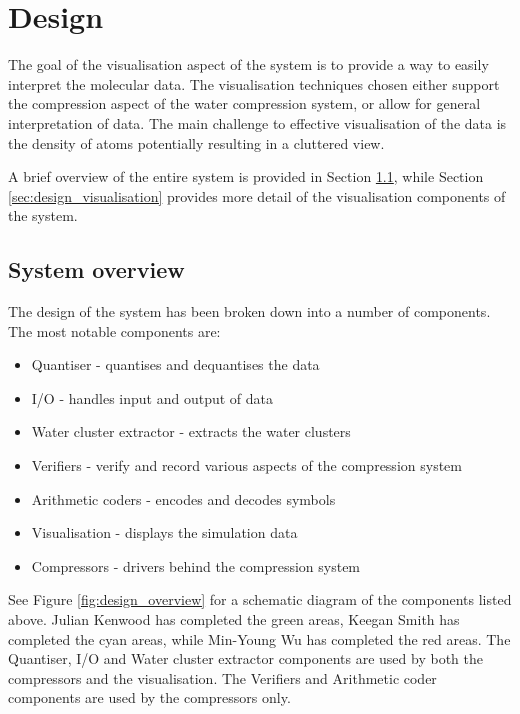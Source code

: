 \graphicspath{{./design/}}

\chapter{Design}
\label{cha:design}


The goal of the visualisation aspect of the system is to provide a way to
easily interpret the molecular data. The visualisation techniques chosen either
support the compression aspect of the water compression system, or allow for
general interpretation of data. The main challenge to effective visualisation
of the data is the density of atoms potentially resulting in a cluttered view.

A brief overview of the entire system is provided in Section
\ref{sec:design_overview}, while Section \ref{sec:design_visualisation}
provides more detail of the visualisation components of the system.


\section{System overview}
\label{sec:design_overview}

The design of the system has been broken down into a number of components. The
most notable components are:

\begin{itemize}
  \item Quantiser - quantises and dequantises the data
  \item I/O - handles input and output of data
  \item Water cluster extractor - extracts the water clusters
  \item Verifiers - verify and record various aspects of the compression system
  \item Arithmetic coders - encodes and decodes symbols
  \item Visualisation - displays the simulation data
  \item Compressors - drivers behind the compression system
\end{itemize}

See Figure \ref{fig:design_overview} for a schematic diagram of the components
listed above. Julian Kenwood has completed the green areas, Keegan Smith has
completed the cyan areas, while Min-Young Wu has completed the red areas. The
Quantiser, I/O and Water cluster extractor components are used by both the
compressors and the visualisation. The Verifiers and Arithmetic coder
components are used by the compressors only.

